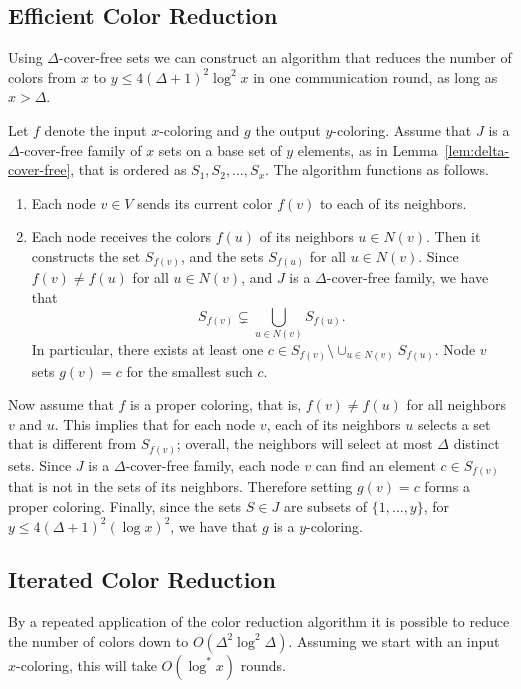 \subsection{Efficient Color Reduction} \label{ssec:efficient-cr}

Using $\Delta$-cover-free sets we can construct an algorithm that reduces the number of colors from $x$ to $y \leq 4(\Delta+1)^2 \log^2 x$ in one communication round, as long as $x > \Delta$.

Let $f$ denote the input $x$-coloring and $g$ the output $y$-coloring. Assume that $J$ is a $\Delta$-cover-free family of $x$ sets on a base set of $y$ elements, as in Lemma~\ref{lem:delta-cover-free}, that is ordered as $S_1, S_2, \dots, S_x$. The algorithm functions as follows.
\begin{enumerate}
  \item Each node $v \in V$ sends its current color $f(v)$ to each of its neighbors.
  \item Each node receives the colors $f(u)$ of its neighbors $u \in N(v)$. Then it constructs the set $S_{f(v)}$, and the sets $S_{f(u)}$ for all $u \in N(v)$. Since $f(v) \neq f(u)$ for all $u\in N(v)$, and $J$ is a $\Delta$-cover-free family, we have that
  \[
    S_{f(v)} \subsetneq \bigcup_{u \in N(v)} S_{f(u)}.
  \]
  In particular, there exists at least one $c \in S_{f(v)} \setminus \cup_{u \in N(v)} S_{f(u)}$. Node $v$ sets $g(v) = c$ for the smallest such $c$.
\end{enumerate}

Now assume that $f$ is a proper coloring, that is, $f(v) \neq f(u)$ for all neighbors $v$ and $u$. This implies that for each node $v$, each of its neighbors $u$ selects a set that is different from $S_{f(v)}$; overall, the neighbors will select at most $\Delta$ distinct sets. Since $J$ is a $\Delta$-cover-free family, each node $v$ can find an element $c \in S_{f(v)}$ that is not in the sets of its neighbors. Therefore setting $g(v) = c$ forms a proper coloring. Finally, since the sets $S \in J$ are subsets of $\{1,\dots,y\}$, for $y \leq 4(\Delta+1)^2 (\log x)^2$, we have that $g$ is a $y$-coloring.

\subsection{Iterated Color Reduction}

By a repeated application of the color reduction algorithm it is possible to reduce the number of colors down to $O(\Delta^2 \log^2 \Delta)$. Assuming we start with an input $x$-coloring, this will take $O(\log^* x)$ rounds.

